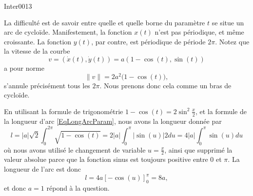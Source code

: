 \begin{corrige}{Inter0013}

La difficulté est de savoir entre quelle et quelle borne du paramètre $t$ se situe un \og arc\fg{} de cycloïde. Manifestement, la fonction $x(t)$ n'est pas périodique, et même croissante. La fonction $y(t)$, par contre, est périodique de période $2\pi$. Notez que la vitesse de la courbe
\begin{equation}
	v=( \dot x(t),\dot y(t) )=a(1-\cos(t),\sin(t))
\end{equation}
a pour norme
\begin{equation}
	\| v \|=2a^2\big( 1-\cos(t) \big),
\end{equation}
s'annule précisément tous les $2\pi$. Nous prenons donc cela comme un bras de cycloïde.

%

En utilisant la formule de trigonométrie $1-\cos(t)=2\sin^2\frac{ x }{ 2 }$, et la formule de la longueur d'arc \eqref{EqLongArcParam}, nous avons la longueur donnée par
\begin{equation}
	l=| a |\sqrt{2}\int_0^{2\pi}\sqrt{1-\cos(t)}=2| a |\int_0^{\pi}|\sin(u)|2 du=4| a |\int_0^{\pi}\sin(u) du
\end{equation}
où nous avons utilisé le changement de variable $u=\frac{ x }{ 2 }$, ainsi que supprimé la valeur absolue parce que la fonction sinus est toujours positive entre $0$ et $\pi$. La longueur de l'arc est donc
\begin{equation}
	l=4a\left[ -\cos(u) \right]_0^{\pi}=8a,
\end{equation}
et donc $a=1$ répond à la question.

\end{corrige}
